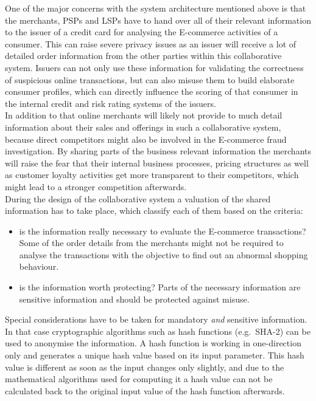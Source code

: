 One of the major concerns with the system architecture mentioned above is that the merchants, \gls{PSP}s and \gls{LSP}s have to hand over all of their relevant information to the issuer of a credit card for analysing the \gls{E-commerce} activities of a consumer. This can raise severe privacy issues as an issuer will receive a lot of detailed order information from the other parties within this collaborative system. Issuers can not only use these information for validating the correctness of suspicious online transactions, but can also misuse them to build elaborate consumer profiles, which can directly influence the scoring of that consumer in the internal credit and risk rating systems of the issuers. \\

In addition to that online merchants will likely not provide to much detail information about their sales and offerings in such a collaborative system, because direct competitors might also be involved in the \gls{E-commerce} fraud investigation. By sharing parts of the business relevant information the merchants will raise the fear that their internal business processes, pricing structures as well as customer loyalty activities get more transparent to their competitors, which might lead to a stronger competition afterwards. \\

During the design of the collaborative system a valuation of the shared information has to take place, which classify each of them based on the criteria: \@

\begin{itemize}
	\item is the information really necessary to evaluate the \gls{E-commerce} transactions? Some of the order details from the merchants might not be required to analyse the transactions with the objective to find out an abnormal shopping behaviour.
	\item is the information worth protecting? Parts of the necessary information are sensitive information and should be protected against misuse.
\end{itemize}

Special considerations have to be taken for mandatory \emph{and} sensitive information. In that case cryptographic algorithms such as hash functions (e.g.\ \gls{SHA-2}) can be used to anonymise the information. A hash function is working in one-direction only and generates a unique hash value based on its input parameter. This hash value is different as soon as the input changes only slightly, and due to the mathematical algorithms used for computing it a hash value can not be calculated back to the original input value of the hash function afterwards. \\

